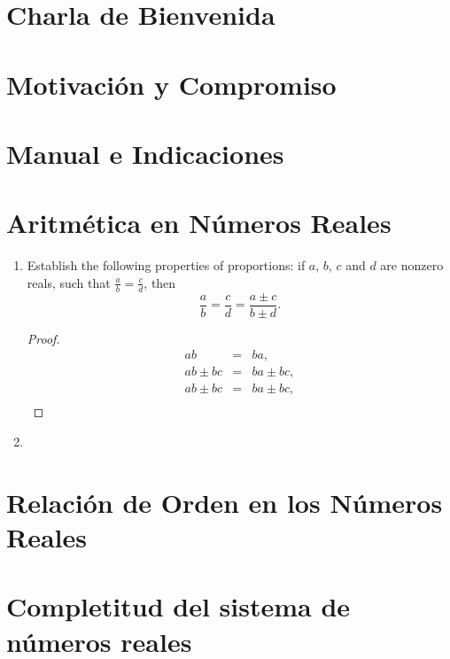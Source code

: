 \section{Charla de Bienvenida}

\section{Motivaci\'{o}n y Compromiso}

\section{Manual e Indicaciones}

\section{Aritm\'{e}tica en N\'{u}meros Reales}
\begin{enumerate}
  \item Establish the following properties of proportions: if $a$, $b$, $c$ and $d$ are nonzero reals, such that $\frac{a}{b}= \frac{c}{d}$, then
  \begin{equation*}
    \frac{a}{b}= \frac{c}{d}= \frac{a\pm c}{b\pm d}.
  \end{equation*}
  \begin{proof}
    \begin{eqnarray*}
      ab&=& ba,\\
      ab\pm bc &=& ba\pm bc,\\
      ab\pm bc &=& ba\pm bc,\\
      
    \end{eqnarray*}
  \end{proof}
  
  \item
\end{enumerate}

\section{Relaci\'{o}n de Orden en los N\'{u}meros Reales}

\section{Completitud del sistema de n\'{u}meros reales}
